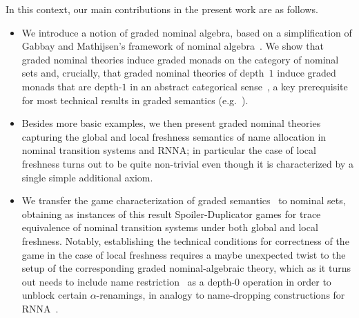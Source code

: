 \documentclass[11pt,a4paper]{amsart}
\theoremstyle{plain}
\numberwithin{equation}{section}
\newcommand{\+}[1]{\mathcal{#1}\xspace}
\theoremstyle{definition}
\begin{document}
In this context, our main contributions in the present work are as
follows.\vspace{-0.5em}
\begin{itemize}[wide]
\item We introduce a notion of graded nominal algebra, based on a
  simplification of Gabbay and Mathijsen's framework of nominal
  algebra~\cite{GabbayMathijssen09}. We show that graded nominal
  theories induce graded monads on the category of nominal sets and,
  crucially, that graded nominal theories of depth~$1$ induce graded
  monads that are depth-$1$ in an abstract categorical
  sense~\cite{MiliusEA15,DorschEA19}, a key prerequisite for most
  technical results in graded semantics
  (e.g.~\cite{MiliusEA15,DorschEA19,FordEA22,ForsterEA25b}).
\item Besides more basic examples, we then present graded nominal
  theories capturing the global and local freshness semantics of name
  allocation in nominal transition systems and RNNA; in particular
  the case of local freshness turns out to be quite non-trivial even
  though it is characterized by a single simple additional axiom.
\item We transfer the game characterization of graded
  semantics~\cite{FordEA22} to nominal sets, obtaining as instances of
  this result Spoiler-Duplicator games for trace equivalence of
  nominal transition systems under both global and local freshness.
  Notably, establishing the technical conditions
  for correctness of the game in the case of local freshness requires a
  maybe unexpected twist to the setup of the corresponding graded
  nominal-algebraic theory, which as it turns out needs to include name
  restriction~\cite{Pitts13} as a depth-$0$ operation in order to
  unblock certain $\alpha$-renamings, in analogy to name-dropping
  constructions for RNNA~\cite{SchroderEA17}.
\end{itemize}
\end{document}
